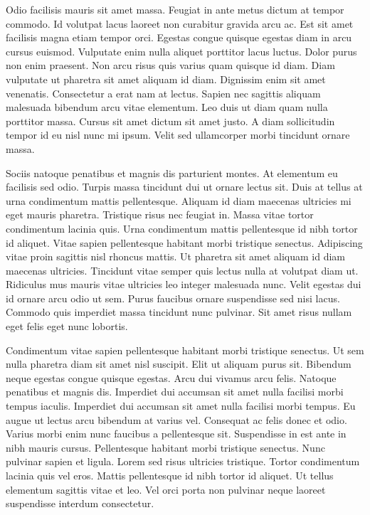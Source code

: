 \documentclass[11pt,a4paper]{article}
\begin{document}
Odio facilisis mauris sit amet massa. Feugiat in ante metus dictum at tempor commodo. Id volutpat lacus laoreet non curabitur gravida arcu ac. Est sit amet facilisis magna etiam tempor orci. Egestas congue quisque egestas diam in arcu cursus euismod. Vulputate enim nulla aliquet porttitor lacus luctus. Dolor purus non enim praesent. Non arcu risus quis varius quam quisque id diam. Diam vulputate ut pharetra sit amet aliquam id diam. Dignissim enim sit amet venenatis. Consectetur a erat nam at lectus. Sapien nec sagittis aliquam malesuada bibendum arcu vitae elementum. Leo duis ut diam quam nulla porttitor massa. Cursus sit amet dictum sit amet justo. A diam sollicitudin tempor id eu nisl nunc mi ipsum. Velit sed ullamcorper morbi tincidunt ornare massa.

Sociis natoque penatibus et magnis dis parturient montes. At elementum eu facilisis sed odio. Turpis massa tincidunt dui ut ornare lectus sit. Duis at tellus at urna condimentum mattis pellentesque. Aliquam id diam maecenas ultricies mi eget mauris pharetra. Tristique risus nec feugiat in. Massa vitae tortor condimentum lacinia quis. Urna condimentum mattis pellentesque id nibh tortor id aliquet. Vitae sapien pellentesque habitant morbi tristique senectus. Adipiscing vitae proin sagittis nisl rhoncus mattis. Ut pharetra sit amet aliquam id diam maecenas ultricies. Tincidunt vitae semper quis lectus nulla at volutpat diam ut. Ridiculus mus mauris vitae ultricies leo integer malesuada nunc. Velit egestas dui id ornare arcu odio ut sem. Purus faucibus ornare suspendisse sed nisi lacus. Commodo quis imperdiet massa tincidunt nunc pulvinar. Sit amet risus nullam eget felis eget nunc lobortis.

Condimentum vitae sapien pellentesque habitant morbi tristique senectus. Ut sem nulla pharetra diam sit amet nisl suscipit. Elit ut aliquam purus sit. Bibendum neque egestas congue quisque egestas. Arcu dui vivamus arcu felis. Natoque penatibus et magnis dis. Imperdiet dui accumsan sit amet nulla facilisi morbi tempus iaculis. Imperdiet dui accumsan sit amet nulla facilisi morbi tempus. Eu augue ut lectus arcu bibendum at varius vel. Consequat ac felis donec et odio. Varius morbi enim nunc faucibus a pellentesque sit. Suspendisse in est ante in nibh mauris cursus. Pellentesque habitant morbi tristique senectus. Nunc pulvinar sapien et ligula. Lorem sed risus ultricies tristique. Tortor condimentum lacinia quis vel eros. Mattis pellentesque id nibh tortor id aliquet. Ut tellus elementum sagittis vitae et leo. Vel orci porta non pulvinar neque laoreet suspendisse interdum consectetur.
\end{document}

